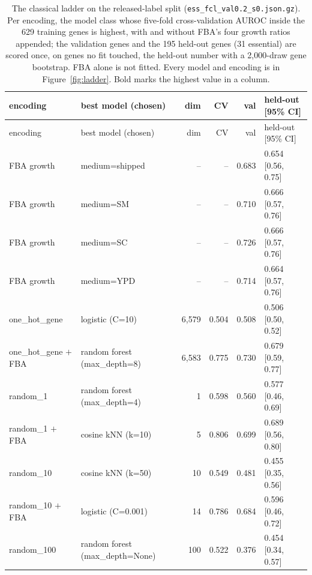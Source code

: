 \begingroup
\footnotesize
\begin{longtable}{@{}llrrrl@{}}
  \caption[Classical ladder]{The classical ladder on the released-label split (\texttt{ess\_fcl\_val0.2\_s0.json.gz}). Per encoding, the model class whose five-fold cross-validation AUROC inside the 629 training genes is highest, with and without FBA's four growth ratios appended; the validation genes and the 195 held-out genes (31 essential) are scored once, on genes no fit touched, the held-out number with a 2,000-draw gene bootstrap. FBA alone is not fitted. Every model and encoding is in Figure~\ref{fig:ladder}. Bold marks the highest value in a column.}
  \label{tab:ladder}\\
    \hline
    encoding & best model (chosen) & dim & CV & val & held-out [95\% CI] \\
    \hline
  \endfirsthead
    \hline
    encoding & best model (chosen) & dim & CV & val & held-out [95\% CI] \\
    \hline
  \endhead
    \hline
  \endfoot
    \hline
  \endlastfoot
    FBA growth & medium=shipped & -- & -- & 0.683 & 0.654 [0.56, 0.75] \\
    FBA growth & medium=SM & -- & -- & 0.710 & 0.666 [0.57, 0.76] \\
    FBA growth & medium=SC & -- & -- & 0.726 & 0.666 [0.57, 0.76] \\
    FBA growth & medium=YPD & -- & -- & 0.714 & 0.664 [0.57, 0.76] \\
    one\_hot\_gene & logistic (C=10) & 6,579 & 0.504 & 0.508 & 0.506 [0.50, 0.52] \\
    one\_hot\_gene $+$ FBA & random forest (max\_depth=8) & 6,583 & 0.775 & 0.730 & 0.679 [0.59, 0.77] \\
    random\_1 & random forest (max\_depth=4) & 1 & 0.598 & 0.560 & 0.577 [0.46, 0.69] \\
    random\_1 $+$ FBA & cosine kNN (k=10) & 5 & 0.806 & 0.699 & 0.689 [0.56, 0.80] \\
    random\_10 & cosine kNN (k=50) & 10 & 0.549 & 0.481 & 0.455 [0.35, 0.56] \\
    random\_10 $+$ FBA & logistic (C=0.001) & 14 & 0.786 & 0.684 & 0.596 [0.46, 0.72] \\
    random\_100 & random forest (max\_depth=None) & 100 & 0.522 & 0.376 & 0.454 [0.34, 0.57] \\

\end{longtable}
